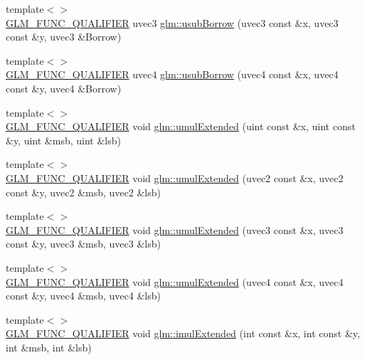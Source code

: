 \begin{DoxyCompactItemize}
\item 
{\footnotesize template$<$$>$ }\\\hyperlink{setup_8hpp_a33fdea6f91c5f834105f7415e2a64407}{G\+L\+M\+\_\+\+F\+U\+N\+C\+\_\+\+Q\+U\+A\+L\+I\+F\+I\+ER} uvec3 \hyperlink{namespaceglm_a3cc22c141f42fb9faf42adb6cb124bb7}{glm\+::usub\+Borrow} (uvec3 const \&x, uvec3 const \&y, uvec3 \&Borrow)
\item 
{\footnotesize template$<$$>$ }\\\hyperlink{setup_8hpp_a33fdea6f91c5f834105f7415e2a64407}{G\+L\+M\+\_\+\+F\+U\+N\+C\+\_\+\+Q\+U\+A\+L\+I\+F\+I\+ER} uvec4 \hyperlink{namespaceglm_a766d4ebce0a5f042f79787ef32862bb4}{glm\+::usub\+Borrow} (uvec4 const \&x, uvec4 const \&y, uvec4 \&Borrow)
\item 
{\footnotesize template$<$$>$ }\\\hyperlink{setup_8hpp_a33fdea6f91c5f834105f7415e2a64407}{G\+L\+M\+\_\+\+F\+U\+N\+C\+\_\+\+Q\+U\+A\+L\+I\+F\+I\+ER} void \hyperlink{namespaceglm_a656a4eb28952b733f8611d6a5e98472f}{glm\+::umul\+Extended} (uint const \&x, uint const \&y, uint \&msb, uint \&lsb)
\item 
{\footnotesize template$<$$>$ }\\\hyperlink{setup_8hpp_a33fdea6f91c5f834105f7415e2a64407}{G\+L\+M\+\_\+\+F\+U\+N\+C\+\_\+\+Q\+U\+A\+L\+I\+F\+I\+ER} void \hyperlink{namespaceglm_a0e0e684a25e4d67be3532c7059eb366c}{glm\+::umul\+Extended} (uvec2 const \&x, uvec2 const \&y, uvec2 \&msb, uvec2 \&lsb)
\item 
{\footnotesize template$<$$>$ }\\\hyperlink{setup_8hpp_a33fdea6f91c5f834105f7415e2a64407}{G\+L\+M\+\_\+\+F\+U\+N\+C\+\_\+\+Q\+U\+A\+L\+I\+F\+I\+ER} void \hyperlink{namespaceglm_a6e66bd04ac16ae0e3eb87e965b1609a9}{glm\+::umul\+Extended} (uvec3 const \&x, uvec3 const \&y, uvec3 \&msb, uvec3 \&lsb)
\item 
{\footnotesize template$<$$>$ }\\\hyperlink{setup_8hpp_a33fdea6f91c5f834105f7415e2a64407}{G\+L\+M\+\_\+\+F\+U\+N\+C\+\_\+\+Q\+U\+A\+L\+I\+F\+I\+ER} void \hyperlink{namespaceglm_af466bd5c7fd7304b486b3f5985805349}{glm\+::umul\+Extended} (uvec4 const \&x, uvec4 const \&y, uvec4 \&msb, uvec4 \&lsb)
\item 
{\footnotesize template$<$$>$ }\\\hyperlink{setup_8hpp_a33fdea6f91c5f834105f7415e2a64407}{G\+L\+M\+\_\+\+F\+U\+N\+C\+\_\+\+Q\+U\+A\+L\+I\+F\+I\+ER} void \hyperlink{namespaceglm_a9472a4d6f9eec4abf4453a4be8365433}{glm\+::imul\+Extended} (int const \&x, int const \&y, int \&msb, int \&lsb)

\end{DoxyCompactItemize}
